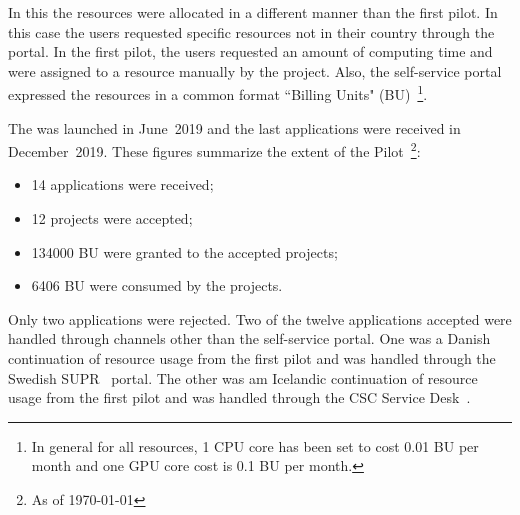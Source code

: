 \newcommand{\BUcons}{6406\xspace}
\newcommand{\BUreq}{134000\xspace}

In this \pilot the resources were allocated in a different manner than the first pilot.
In this case the users requested specific resources not in their country through the portal. 
In the first pilot, the users requested an amount of computing time and were assigned to a resource manually by the \dell project.
Also, the self-service portal expressed the \einfra resources in a common format ``Billing Units" (BU)~\footnote{In general for all \dell resources, 1 CPU core has been set to cost 0.01 BU per month and one GPU core cost is 0.1 BU per month.}.

The \dell \pilot was launched in June~2019 and the last applications were received in December~2019. 
These figures summarize the extent of the Pilot~\footnote{As of \today}:
\begin{itemize}
\item 14 applications were received;
\item 12 projects were accepted;
\item \BUreq BU were granted to the accepted projects;
\item \BUcons BU were consumed by the projects.
\end{itemize}
Only two applications were rejected. 
Two of the twelve applications accepted were handled through channels other than the self-service portal.
One was a Danish continuation of resource usage from the first \dell pilot and was handled through the Swedish SUPR~\cite{supr} portal.
The other was am Icelandic continuation of resource usage from the first \dell pilot and was handled through the CSC Service Desk~\cite{csc-service-desk}.


